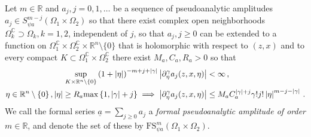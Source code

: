 \documentclass[
	fontsize=11pt, 
	twoside=false, 
	abstract=true, 
	a4paper,
]{scrartcl}
\newcommand{\eps}{\varepsilon}
\newcommand{\sem}{\setminus\{0\}}
\newcommand{\RR}{\mathbb{R}}
\newcommand{\CC}{\mathbb{C}}
\newcommand{\abs}[1]{\left\lvert#1\right\rvert}
\newcommand{\del}{\partial}
\newcommand{\ud}[1]{\underline{#1}}
\begin{document}

\begin{definition}\label{def:formalamp}
	Let $m\in \RR$ and $a_j, j =0,1,\dots$ be a sequence of pseudoanalytic amplitudes $a_j \in S^{m-j}_{\psi a}(\Omega_1\times\Omega_2)$ so that there exist complex open neighborhoods $\Omega_k^{\CC}\supset \Omega_k, k=1,2$, independent of $j$, so that $a_j, j\geq 0$ can be extended to a function on $\Omega_1^{\CC}\times\Omega_2^{\CC}\times\RR^n\sem$ that is holomorphic with respect to $(z,x)$ and to every compact $K \subset \Omega_1^{\CC}\times\Omega_2^{\CC}$ there exist $M_a,C_a,R_a >0$ so that
	\begin{align}
		\sup_{K \times \RR^n\sem} \left(1+\abs{\eta}\right)^{-m+j+\abs{\gamma}}\abs{\del^\gamma_\eta a_j(z,x,\eta)} &< \infty\,,\notag\\%
		\eta\in \RR^n\sem\,,\abs{\eta} \geq R_a\mathrm{max}\left\{1,\abs{\gamma}+j\right\} \implies \abs{\del^\gamma_\eta a_j(z,x,\eta)} &\leq M_a C_a^{\abs{\gamma}+j} \gamma!j! \abs{\eta}^{m-j-\abs{\gamma}}\,.\label{eq:defofclasym}
	\end{align}
	We call the formal series $\ud{a} = \sum_{j\geq 0} a_j$ a \emph{formal pseudoanalytic amplitude of order $m\in\RR$}, and denote the set of these by $\mathrm{FS}^m_{\psi a}(\Omega_1\times\Omega_2)$. 
%
%
%
%
\end{definition}
\end{document}
